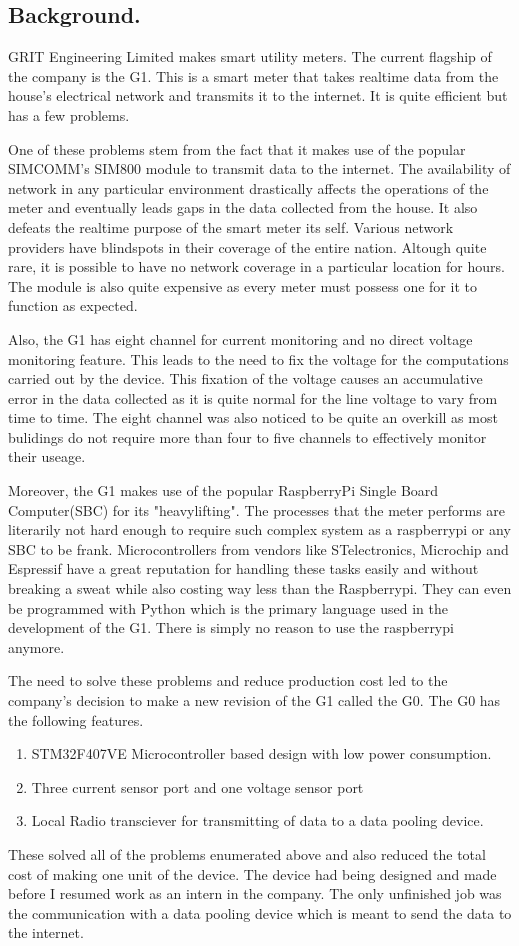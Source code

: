 \subsection{Background.}
GRIT Engineering Limited makes smart utility meters. The current flagship of the company is the G1. This is a smart meter that takes realtime data from the house's electrical network and transmits it to the internet. It is quite efficient but has a few problems. 

One of these problems stem from the fact that it makes use of the popular SIMCOMM's SIM800 module to transmit data to the internet. The availability of network in any particular environment drastically affects the operations of the meter and eventually leads gaps in the data collected from the house. It also defeats the realtime purpose of the smart meter its self. Various network providers have blindspots in their coverage of the entire nation. Altough quite rare, it is possible to have no network coverage in a particular location for hours. The module is also quite expensive as every meter must possess one for it to function as expected. 

Also, the G1 has eight channel for current monitoring and no direct voltage monitoring feature. This leads to the need to fix the voltage for the computations carried out by the device. This fixation of the voltage causes an accumulative error in the data collected as it is quite normal for the line voltage to vary from time to time. The eight channel was also noticed to be quite an overkill as most bulidings do not require more than four to five channels to effectively monitor their useage.

Moreover, the G1 makes use of the popular RaspberryPi Single Board Computer(SBC) for its "heavylifting". The processes that the meter performs are literarily not hard enough to require such complex system as a raspberrypi or any SBC to be frank. Microcontrollers from vendors like STelectronics, Microchip and Espressif have a great reputation for handling these tasks easily and without breaking a sweat while also costing way less than the Raspberrypi. They can even be programmed with Python which is the primary language used in the development of the G1. There is simply no reason to use the raspberrypi anymore.

The need to solve these problems and reduce production cost led to the company's decision to make a new revision of the G1 called the G0. The G0 has the following features.
\begin{enumerate}
\item STM32F407VE Microcontroller based design with low power consumption.
\item Three current sensor port and one voltage sensor port
\item Local Radio transciever for transmitting of data to a data pooling device.
\end{enumerate}
These solved all of the problems enumerated above and also reduced the total cost of making one unit of the device. The device had being designed and made before I resumed work as an intern in the company. The only unfinished job was the communication with a data pooling device which is meant to send the data to the internet.

